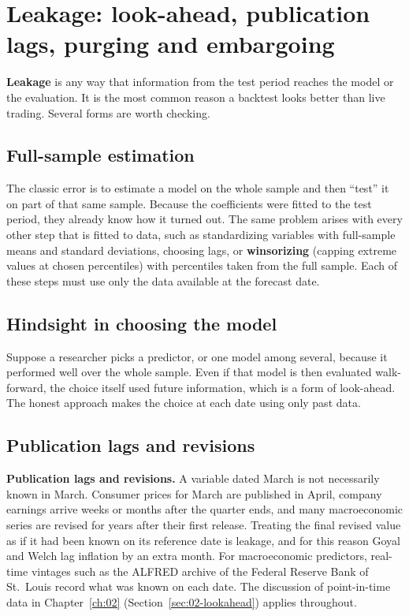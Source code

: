 \section{Leakage: look-ahead, publication lags, purging and embargoing}
\label{sec:05-leakage}

\textbf{Leakage} is any way that information from the test period reaches the model or the evaluation. It is the most common reason a backtest looks better than live trading. Several forms are worth checking.

\subsection{Full-sample estimation} 


The classic error is to estimate a model on the whole sample and then ``test'' it on part of that same sample. Because the coefficients were fitted to the test period, they already know how it turned out. The same problem arises with every other step that is fitted to data, such as standardizing variables with full-sample means and standard deviations, choosing lags, or \textbf{winsorizing} (capping extreme values at chosen percentiles) with percentiles taken from the full sample. Each of these steps must use only the data available at the forecast date.

\subsection{Hindsight in choosing the model} 


Suppose a researcher picks a predictor, or one model among several, because it performed well over the whole sample. Even if that model is then evaluated walk-forward, the choice itself used future information, which is a form of look-ahead. The honest approach makes the choice at each date using only past data.


\subsection{Publication lags and revisions}

\textbf{Publication lags and revisions.} A variable dated March is not necessarily known in March. Consumer prices for March are published in April, company earnings arrive weeks or months after the quarter ends, and many macroeconomic series are revised for years after their first release. Treating the final revised value as if it had been known on its reference date is leakage, and for this reason Goyal and Welch lag inflation by an extra month. For macroeconomic predictors, real-time vintages such as the ALFRED archive of the Federal Reserve Bank of St.\ Louis record what was known on each date. The discussion of point-in-time data in Chapter~\ref{ch:02} (Section~\ref{sec:02-lookahead}) applies throughout.


